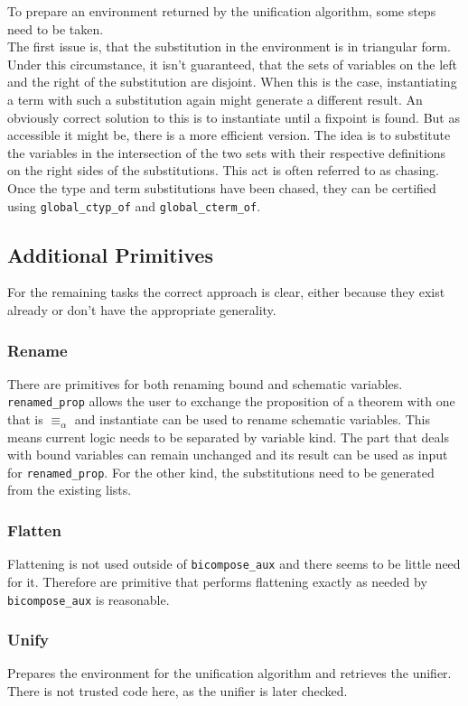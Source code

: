To prepare an environment returned by the unification algorithm, some steps need to be taken.\\
The first issue is, that the substitution in the environment is in triangular form. Under this circumstance, it isn't guaranteed, that the sets of variables on the left and the right of the substitution are disjoint. When this is the case, instantiating a term with such a substitution again might generate a different result. An obviously correct solution to this is to instantiate until a fixpoint is found. But as accessible it might be, there is a more efficient version. The idea is to substitute the variables in the intersection of the two sets with their respective definitions on the right sides of the substitutions. This act is often referred to as chasing. Once the type and term substitutions have been chased, they can be certified using \texttt{global\_ctyp\_of} and \texttt{global\_cterm\_of}.

\subsection{Additional Primitives}

For the remaining tasks the correct approach is clear, either because they exist already or don't have the appropriate generality.

\subsubsection{Rename} There are primitives for both renaming bound and schematic variables. \texttt{renamed\_prop} allows the user to exchange the proposition of a theorem with one that is $\equiv_\alpha$ and instantiate can be used to rename schematic variables. This means current logic needs to be separated by variable kind. The part that deals with bound variables can remain unchanged and its result can be used as input for \texttt{renamed\_prop}. For the other kind, the substitutions need to be generated from the existing lists.
\subsubsection{Flatten} Flattening is not used outside of \texttt{bicompose\_aux} and there seems to be little need for it. Therefore are primitive that performs flattening exactly as needed by \texttt{bicompose\_aux} is reasonable.
\subsubsection{Unify} Prepares the environment for the unification algorithm and retrieves the unifier. There is not trusted code here, as the unifier is later checked.
